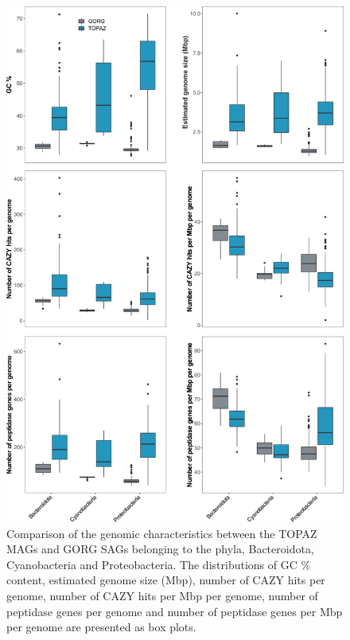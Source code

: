 \documentclass[12pt]{article}
\numberwithin{equation}{section}
\begin{document}
\begin{figure}[h!]    
    \centering
    \includegraphics[width = 0.75\columnwidth]{si-figures/Figure2-TOPAZ_prok_features_vsGORG_mod.png}
    \caption{Comparison of the genomic characteristics between the TOPAZ MAGs and GORG SAGs belonging to the phyla, Bacteroidota, Cyanobacteria and Proteobacteria. The distributions of GC \% content, estimated genome size (Mbp), number of CAZY hits per genome, number of CAZY hits per Mbp per genome, number of peptidase genes per genome and number of peptidase genes per Mbp per genome are presented as box plots. }
    \label{fig:fig6-prokfunc}
\end{figure}
\end{document}
